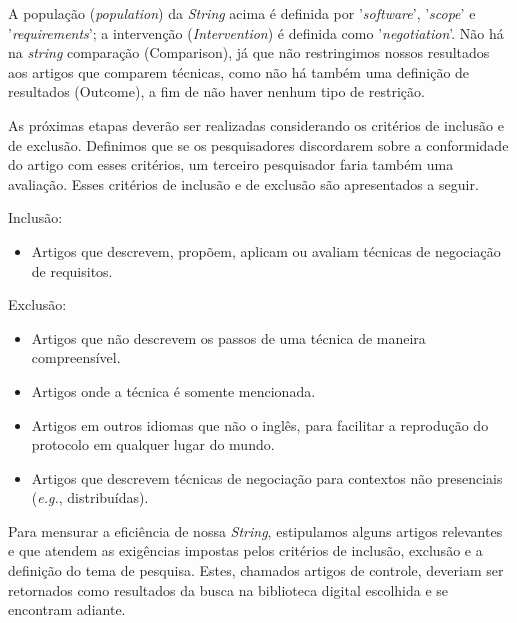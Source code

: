 A população (\textit{population}) da \textit{String} acima é definida por
'\textit{software}', '\textit{scope}' e '\textit{requirements}'; a intervenção (\textit{Intervention}) é definida como
'\textit{negotiation}'.
Não há na \textit{string} comparação (Comparison), já que não restringimos
nossos resultados aos artigos que comparem técnicas, como não há também uma definição
de resultados (Outcome), a fim de não haver nenhum tipo de restrição.

As próximas etapas deverão ser realizadas considerando os critérios de inclusão
e de exclusão. Definimos que se os pesquisadores discordarem sobre a
conformidade do artigo com esses critérios, um terceiro pesquisador faria também
uma avaliação. Esses critérios de inclusão e de exclusão são apresentados a
seguir.

Inclusão:
\begin{itemize}
\setlength{\itemsep}{1pt}
\setlength{\itemindent}{20pt}
\item {Artigos que descrevem, propõem, aplicam ou avaliam técnicas de negociação
de requisitos.}
\end{itemize}

Exclusão:
\begin{itemize}
\setlength{\itemsep}{1pt}
\setlength{\itemindent}{20pt}
\item {Artigos que não descrevem os passos de uma técnica de maneira
compreensível.}
\item {Artigos onde a técnica é somente mencionada.}
\item {Artigos em outros idiomas que não o inglês, para facilitar a reprodução
do protocolo em qualquer lugar do mundo.}
\item {Artigos que descrevem técnicas de negociação para contextos não presenciais (\textit{e.g.}, distribuídas).}
\end{itemize}

Para mensurar a eficiência de nossa \textit{String}, estipulamos alguns artigos
relevantes e que atendem as exigências impostas pelos critérios de inclusão,
exclusão e a definição do tema de pesquisa. Estes, chamados artigos de controle,
deveriam ser retornados como resultados da busca na biblioteca digital escolhida
e se encontram adiante.


